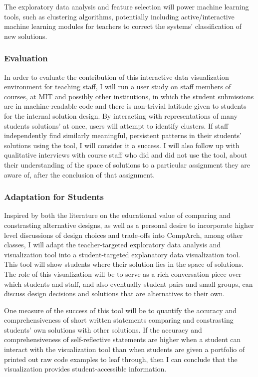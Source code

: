 \documentclass[12pt]{article}
\begin{document}
The exploratory data analysis and feature selection will power machine learning tools, such as clustering algorithms, potentially including active/interactive machine learning modules for teachers to correct the systems' classification of new solutions. 

\subsubsection{Evaluation}

In order to evaluate the contribution of this interactive data visualization environment for teaching staff, I will run a user study on staff members of courses, at MIT and possibly other institutions, in which the student submissions are in machine-readable code and there is non-trivial latitude given to students for the internal solution design. By interacting with representations of many students solutions' at once, users will attempt to identify clusters. If staff independently find similarly meaningful, persistent patterns in their students' solutions using the tool, I will consider it a success. I will also follow up with qualitative interviews with course staff who did and did not use the tool, about their understanding of the space of solutions to a particular assignment they are aware of, after the conclusion of that assignment.

\subsubsection{Adaptation for Students}

Inspired by both the literature on the educational value of comparing and constrasting alternative designs, as well as a personal desire to incorporate higher level discussions of design choices and trade-offs into CompArch, among other classes, I will adapt the teacher-targeted exploratory data analysis and visualization tool into a student-targeted explanatory data visualization tool. This tool will show students where their solution lies in the space of solutions. The role of this visualization will be to serve as a rich conversation piece over which students and staff, and also eventually student pairs and small groups, can discuss design decisions and solutions that are alternatives to their own. 

One measure of the success of this tool will be to quantify the accuracy and comprehensiveness of short written statements comparing and constrasting students' own solutions with other solutions. If the accuracy and comprehensiveness of self-reflective statements are higher when a student can interact with the visualization tool than when students are given a portfolio of printed out raw code examples to leaf through, then I can conclude that the visualization provides student-accessible information.
\end{document}
